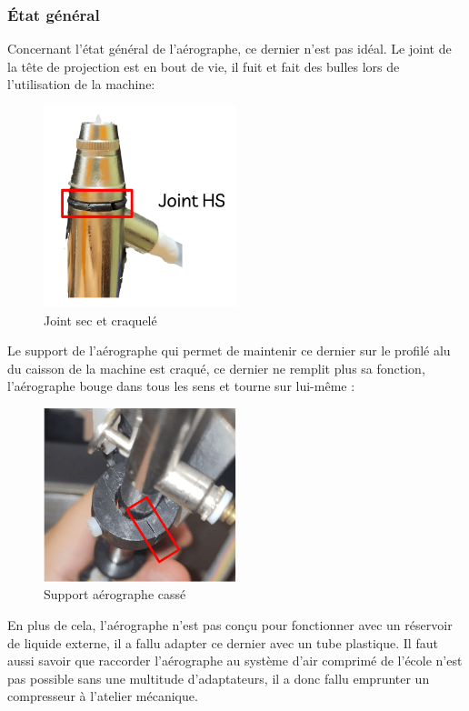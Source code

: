 \newpage
\subsubsection{État général}
Concernant l'état général de l'aérographe, ce dernier n'est pas idéal.
Le joint de la tête de projection est en bout de vie, il fuit et fait des bulles lors de l'utilisation de la machine:
\begin{figure}[H]
  \centering
  \includegraphics[width = 0.5\textwidth]{assets/figures/situation_initiale/joint_aerographe_HS.png}
  \caption{Joint sec et craquelé}
\end{figure}

Le support de l'aérographe qui permet de maintenir ce dernier sur le profilé alu du caisson de la machine est craqué,
ce dernier ne remplit plus sa fonction, l'aérographe bouge dans tous les sens et tourne sur lui-même :
\begin{figure}[H]
  \centering
  \includegraphics[width = 0.5\textwidth]{assets/figures/situation_initiale/support_aerographe_casse.png}
  \caption{Support aérographe cassé}
\end{figure}
En plus de cela, l'aérographe n'est pas conçu pour fonctionner avec un réservoir de liquide externe, il a fallu adapter ce dernier avec un tube plastique.
Il faut aussi savoir que raccorder l'aérographe au système d'air comprimé de l'école n'est pas possible sans une multitude d'adaptateurs, il a donc fallu emprunter
un compresseur à l'atelier mécanique.

